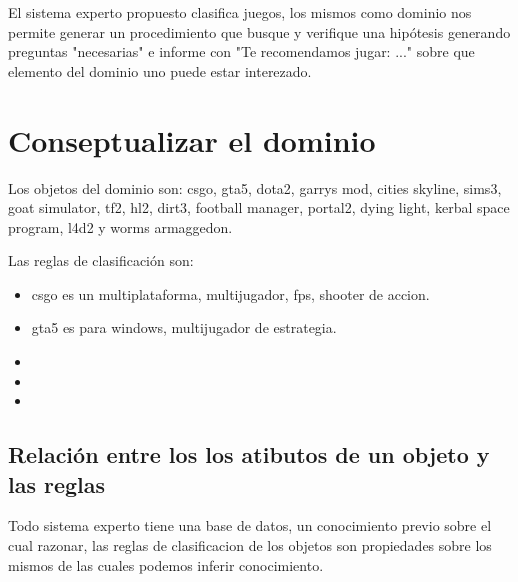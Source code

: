 \documentclass[11pt,oneside,a4paper]{article}
\begin{document}
El sistema experto propuesto clasifica juegos, los mismos como 
dominio nos permite generar un procedimiento que busque y verifique
una hipótesis generando preguntas "necesarias" e informe con
"Te recomendamos jugar: ..." sobre que elemento del dominio uno 
puede estar interezado.


\section{Conseptualizar el dominio}

Los objetos del dominio son:
csgo, 
gta5, 
dota2, 
garrys mod, 
cities skyline, 
sims3, 
goat simulator, 
tf2, 
hl2, 
dirt3, 
football manager, 
portal2, 
dying light, 
kerbal space program, 
l4d2 y 
worms armaggedon.

Las reglas de clasificación son:

\begin{itemize}
  \item csgo es un multiplataforma, multijugador, fps, shooter de accion. 
  \item gta5 es para windows, multijugador de estrategia.
  \item 
  \item 
  \item 
\end{itemize}

\subsection{Relación entre los los atibutos de un objeto y las reglas}


Todo sistema experto tiene una base de datos, un conocimiento previo sobre el
cual razonar, las reglas de clasificacion de los objetos son propiedades
sobre los mismos de las cuales podemos inferir conocimiento.
\end{document}
